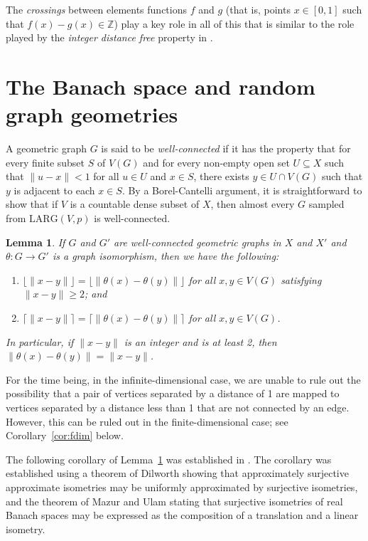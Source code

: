 \documentclass{daj}
\newtheorem{lem}[thm]{Lemma}
\newcommand{\LARG}{\mathrm{LARG}}
\newcommand{\Z}{\mathbb Z}
\begin{document}
The \emph{crossings} between elements functions $f$ and $g$ (that is, points
$x\in[0,1]$ such that $f(x)-g(x)\in\Z$) play a key role in all of this that is similar to the
role played by the \emph{integer distance free} property in \cite{BJ1}.

\section{The Banach space and random graph geometries}

A geometric graph $G$ is said to be
\emph{well-connected} if it has the property that for every finite subset $S$ of $V(G)$ and
for every non-empty open set $U\subseteq X$ such that $\|u-x\|<1$ for all $u\in U$ and $x\in S$,
there exists $y\in U\cap V(G)$ such that $y$ is adjacent to each $x\in S$.
By a Borel-Cantelli argument,
it is straightforward to show that if $V$ is a countable  dense subset of $X$,
then almost every $G$ sampled from $\LARG(V,p)$
is well-connected.


\begin{lem}\label{lem:wellcon}
If $G$ and $G'$ are well-connected geometric
graphs in $X$ and $X'$ and $\theta\colon G\to G'$ is a graph isomorphism, then we have the following:
\begin{enumerate}
\item $\lfloor \|x-y\|\rfloor=\lfloor \|\theta(x)-\theta(y)\|\rfloor$ for all $x,y\in V(G)$
satisfying $\|x-y\|\ge 2$; and
\item $\lceil \|x-y\|\rceil=\lceil \|\theta(x)-\theta(y)\|\rceil$ for all $x,y\in V(G)$.
\end{enumerate}
In particular, if $\|x-y\|$ is an integer and is at least 2, then $\|\theta(x)-\theta(y)\|=\|x-y\|$.
\end{lem}

For the time being, in the infinite-dimensional case, we are unable to rule out
the possibility that a pair of vertices
separated by a distance of 1 are mapped to vertices separated by a distance less than 1
that are not connected by an edge. However, this can be ruled out in the finite-dimensional case; see
Corollary~\ref{cor:fdim} below.

The following corollary of Lemma~\ref{lem:wellcon} was established in \cite{BJQ1}. The corollary 
was established using a theorem of Dilworth \cite{Dilworth} showing that approximately surjective approximate isometries
may be uniformly approximated by surjective isometries, and the theorem of Mazur and Ulam stating that
surjective isometries of real Banach spaces may be expressed as the composition of a translation
and a linear isometry.
\end{document}
